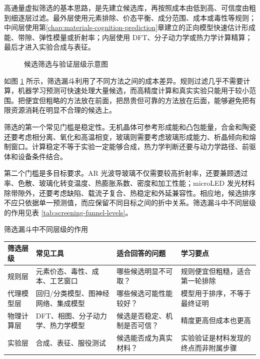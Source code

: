 高通量虚拟筛选的基本思路，是先建立候选库，再按照成本由低到高、可信度由粗到细逐层过滤。最外层使用元素排除、价态平衡、成分范围、成本或毒性等规则；中间层使用第\ref{chap:materials-cognition-prediction}章建立的正向模型快速估计形成能、带隙、弹性模量或折射率；内层使用 DFT、分子动力学或热力学计算精算；最后才进入实验合成与表征。


\begin{figure}[H]
\centering
{}
\caption{候选筛选与验证层级示意图}
\label{fig:candidate-screening-validation}
\end{figure}
\FloatBarrier

如图 \ref{fig:candidate-screening-validation} 所示，筛选漏斗利用了不同方法之间的成本差异。规则过滤几乎不需要计算，机器学习预测可快速处理大量候选，而高精度计算和真实实验只能用于较小范围。把便宜但粗略的方法放在前面，把昂贵但可靠的方法放在后面，能够避免把有限资源消耗在明显不合理的候选上。


筛选的第一个常见门槛是稳定性。无机晶体可参考形成能和凸包能量，合金和陶瓷还要考虑相分离、氧化和高温相变，玻璃则需要考虑玻璃形成能力、析晶倾向和熔制窗口。计算稳定不等于实验一定能够合成，热力学判断还要与动力学路径、前驱体和设备条件结合。


第二个门槛是多目标要求。AR 光波导玻璃不仅需要较高折射率，还要兼顾透过率、色散、玻璃化转变温度、热膨胀系数、密度和加工性能；microLED 发光材料除带隙外，还要考虑缺陷、载流子复合、热稳定和外延兼容性。相应地，候选排序不应只依据单一预测值，而应保留不同目标之间的折中关系。筛选漏斗中不同层级的作用见表 \ref{tab:screening-funnel-levels}。


\begin{formalTable}[htbp]
\caption{筛选漏斗中不同层级的作用}
\label{tab:screening-funnel-levels}
\begin{tabularx}{\textwidth}{@{}YYYY@{}}
\toprule
\textbf{筛选层级} & \textbf{常见工具} & \textbf{适合回答的问题} & \textbf{学习要点} \\
\midrule
规则层 & 元素价态、毒性、成本、工艺窗口 & 哪些候选明显不可取？ & 规则便宜但粗糙，适合第一轮排除 \\
代理模型层 & 回归/分类模型、图神经网络、集成模型 & 哪些候选可能性能较好？ & 模型用于排序，不等于最终证明 \\
物理计算层 & DFT、相图、分子动力学、热力学模型 & 候选是否稳定、机制是否可信？ & 精度更高但成本也更高 \\
实验层 & 合成、表征、服役测试 & 候选能否成为真实材料？ & 实验验证是材料发现的终点而非附属步骤 \\
\bottomrule
\end{tabularx}
\end{formalTable}

